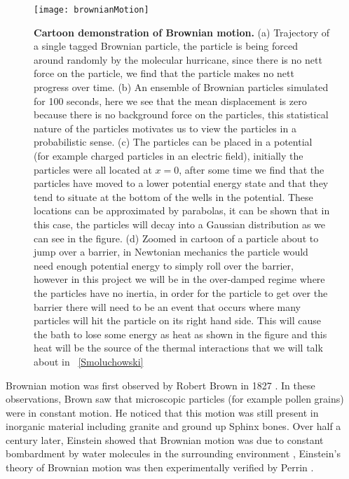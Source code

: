 \begin{figure}
	\texttt{[image: brownianMotion]}
	\caption{\textbf{Cartoon demonstration of Brownian motion.} (a) Trajectory of a single tagged Brownian particle, the particle is being forced around randomly by the molecular hurricane, since there is no nett force on the particle, we find that the particle makes no nett progress over time. (b) An ensemble of Brownian particles simulated for 100 seconds, here we see that the mean displacement is zero because there is no background force on the particles, this statistical nature of the particles motivates us to view the particles in a probabilistic sense. (c) The particles can be placed in a potential (for example charged particles in an electric field), initially the particles were all located at $x = 0$, after some time we find that the particles have moved to a lower potential energy state and that they tend to situate at the bottom of the wells in the potential. These locations can be approximated by parabolas, it can be shown that in this case, the particles will decay into a Gaussian distribution \cite{UhlenbeckOrnstein1930} as we can see in the figure. (d) Zoomed in cartoon of a particle about to jump over a barrier, in Newtonian mechanics the particle would need enough potential energy to simply roll over the barrier, however in this project we will be in the over-damped regime where the particles have no inertia, in order for the particle to get over the barrier there will need to be an event that occurs where many particles will hit the particle on its right hand side. This will cause the bath to lose some energy as heat as shown in the figure and this heat will be the source of the thermal interactions that we will talk about in ~\autoref{Smoluchowski}  \label{fig:brownianMotion}}
\end{figure}


Brownian motion was first observed by Robert Brown in 1827 \cite{Brown1828}. In these observations, Brown saw that microscopic particles (for example pollen grains) were in constant motion. He noticed that this motion was still present in inorganic material including granite and ground up Sphinx bones.
Over half a century later, Einstein showed that Brownian motion was due to constant bombardment by water molecules in the surrounding environment \cite{Einstein1905}, Einstein's theory of Brownian motion was then experimentally verified by Perrin \cite{Perrin2013}.

